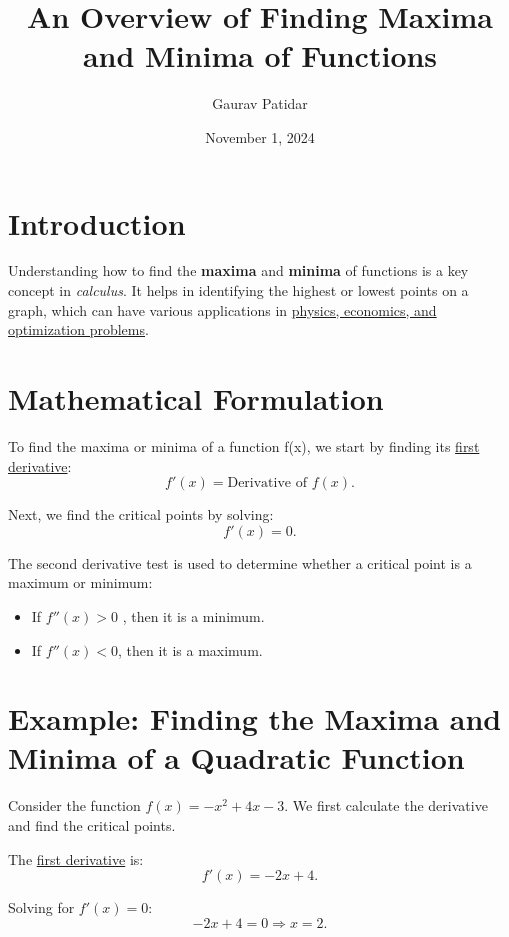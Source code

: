 \documentclass{article}
\title{An Overview of Finding Maxima and Minima of Functions}
\author{Gaurav Patidar}
\date{November 1, 2024}
\begin{document}
\maketitle

\tableofcontents
\newpage
\section{Introduction}
\label{sec:1}
Understanding how to find the \textbf{maxima} and \textbf{minima} of functions is a key concept in \textit{calculus}. It helps in identifying the highest or lowest points on a graph, which can have various applications in \underline{physics, economics, and optimization problems}.
\newpage
\section{Mathematical Formulation}
To find the maxima or minima of a function f(x), we start by finding its \underline{first derivative}:
\begin{equation}
f'(x) = \text{Derivative of } f(x).
\end{equation}

Next, we find the critical points by solving:
\begin{equation}
f'(x) = 0.
\end{equation}

The second derivative test is used to determine whether a critical point is a maximum or minimum:
\begin{itemize}
    \item If \( f''(x) > 0 \) , then it is a minimum.
    \item If \( f''(x) < 0 \), then it is a maximum.
\end{itemize}
\newpage
\section{Example: Finding the Maxima and Minima of a Quadratic Function}
Consider the function \(f(x) = -x^2 + 4x - 3\). We first calculate the derivative and find the critical points.

The \underline{first derivative}\textbf{} is:
\begin{equation}
f'(x) = -2x + 4.
\end{equation}

Solving for \(f'(x) = 0\):
\begin{equation}
-2x + 4 = 0 \Rightarrow x = 2.
\end{equation}
\end{document}

